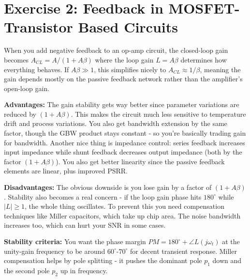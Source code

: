 \documentclass[main.tex]{subfiles}
\begin{document}
\section{Exercise 2: Feedback in MOSFET-Transistor Based Circuits}

When you add negative feedback to an op-amp circuit, the closed-loop gain becomes $A_{CL} = A/(1+A\beta)$ where the loop gain $L=A\beta$ determines how everything behaves. If $A\beta \gg 1$, this simplifies nicely to $A_{CL} \approx 1/\beta$, meaning the gain depends mostly on the passive feedback network rather than the amplifier's open-loop gain.

\textbf{Advantages:} The gain stability gets way better since parameter variations are reduced by $(1+A\beta)$. This makes the circuit much less sensitive to temperature drift and process variations. You also get bandwidth extension by the same factor, though the GBW product stays constant - so you're basically trading gain for bandwidth. Another nice thing is impedance control: series feedback increases input impedance while shunt feedback decreases output impedance (both by the factor $(1+A\beta)$). You also get better linearity since the passive feedback elements are linear, plus improved PSRR.

\textbf{Disadvantages:} The obvious downside is you lose gain by a factor of $(1+A\beta)$. Stability also becomes a real concern - if the loop gain phase hits $180^\circ$ while $|L| \geq 1$, the whole thing oscillates. To prevent this you need compensation techniques like Miller capacitors, which take up chip area. The noise bandwidth increases too, which can hurt your SNR in some cases.

\textbf{Stability criteria:} You want the phase margin $PM = 180^\circ + \angle L(j\omega_t)$ at the unity-gain frequency to be around $60^\circ$-$70^\circ$ for decent transient response. Miller compensation helps by pole splitting - it pushes the dominant pole $p_1$ down and the second pole $p_2$ up in frequency.
\end{document}
